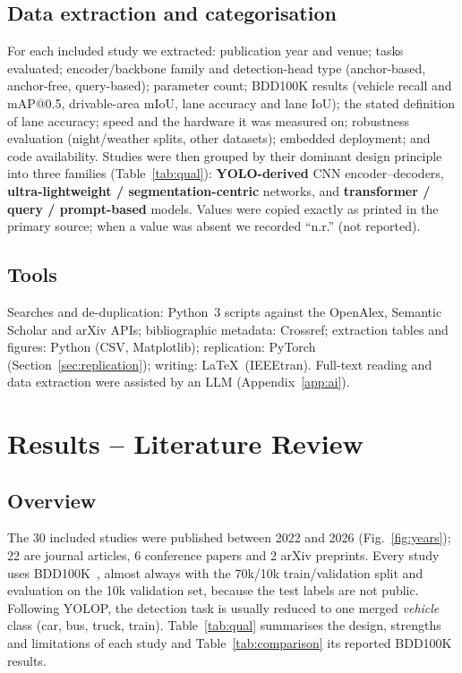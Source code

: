 \documentclass[journal,onecolumn]{IEEEtran}
\begin{document}
\subsection{Data extraction and categorisation}
For each included study we extracted: publication year and venue; tasks evaluated; encoder/backbone family and detection-head type (anchor-based, anchor-free, query-based); parameter count; BDD100K results (vehicle recall and mAP@0.5, drivable-area mIoU, lane accuracy and lane IoU); the stated definition of lane accuracy; speed and the hardware it was measured on; robustness evaluation (night/weather splits, other datasets); embedded deployment; and code availability. Studies were then grouped by their dominant design principle into three families (Table~\ref{tab:qual}): \textbf{YOLO-derived} CNN encoder--decoders, \textbf{ultra-lightweight / segmentation-centric} networks, and \textbf{transformer / query / prompt-based} models. Values were copied exactly as printed in the primary source; when a value was absent we recorded ``n.r.'' (not reported).

\subsection{Tools}
Searches and de-duplication: Python~3 scripts against the OpenAlex, Semantic Scholar and arXiv APIs; bibliographic metadata: Crossref; extraction tables and figures: Python (CSV, Matplotlib); replication: PyTorch (Section~\ref{sec:replication}); writing: \LaTeX\ (IEEEtran). Full-text reading and data extraction were assisted by an LLM (Appendix~\ref{app:ai}).

\section{Results -- Literature Review}\label{sec:results}

\subsection{Overview}
The 30 included studies were published between 2022 and 2026 (Fig.~\ref{fig:years}); 22 are journal articles, 6 conference papers and 2 arXiv preprints. Every study uses BDD100K~\cite{yu2020bdd100k}, almost always with the 70k/10k train/validation split and evaluation on the 10k validation set, because the test labels are not public. Following YOLOP, the detection task is usually reduced to one merged \emph{vehicle} class (car, bus, truck, train). Table~\ref{tab:qual} summarises the design, strengths and limitations of each study and Table~\ref{tab:comparison} its reported BDD100K results.
\end{document}
